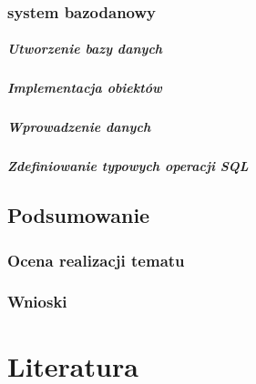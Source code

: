 \documentclass[polish, 11pt]{article}
\begin{document}
	    \subsubsection{system bazodanowy}
		    \subparagraph{Utworzenie bazy danych}
		    
		    \subparagraph{Implementacja obiektów}
		    
		    \subparagraph{Wprowadzenie danych}
		    
		    \subparagraph{Zdefiniowanie typowych operacji SQL}

    \subsection{Podsumowanie}
	    \subsubsection{Ocena realizacji tematu}
	    
		\subsubsection{Wnioski}

\section{Literatura}
\end{document}
